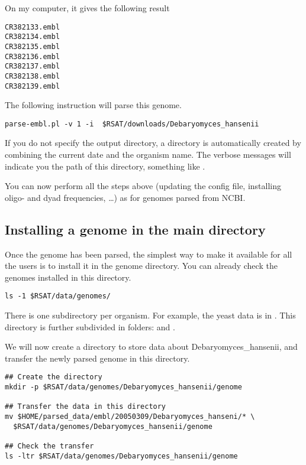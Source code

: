 On my computer, it gives the following result

\begin{footnotesize}
\begin{verbatim}
CR382133.embl
CR382134.embl
CR382135.embl
CR382136.embl
CR382137.embl
CR382138.embl
CR382139.embl
\end{verbatim}
\end{footnotesize}

The following instruction will parse this genome.

\begin{footnotesize}
\begin{verbatim}
parse-embl.pl -v 1 -i  $RSAT/downloads/Debaryomyces_hansenii
\end{verbatim}
\end{footnotesize}

If you do not specify the output directory, a directory is
automatically created by combining the current date and the organism
name.  The verbose messages will indicate you the path of this
directory, something like
.

You can now perform all the steps above (updating the config file,
installing oligo- and dyad frequencies, \ldots) as for genomes parsed
from NCBI.



\subsection{Installing a genome in the main \RSAT directory}

Once the genome has been parsed, the simplest way to make it available
 for all the users is to install it in the \RSAT genome directory. You
 can already check the genomes installed in this directory.

\begin{footnotesize}
\begin{verbatim}
ls -1 $RSAT/data/genomes/
\end{verbatim}
\end{footnotesize}

There is one subdirectory per organism. For example, the yeast data is
 in . This
 directory is further subdivided in folders:  and
 .

We will now create a directory to store data about
 Debaryomyces\_hansenii, and transfer the newly parsed genome in this
 directory.

\begin{footnotesize}
\begin{verbatim}
## Create the directory
mkdir -p $RSAT/data/genomes/Debaryomyces_hansenii/genome

## Transfer the data in this directory
mv $HOME/parsed_data/embl/20050309/Debaryomyces_hanseni/* \
  $RSAT/data/genomes/Debaryomyces_hansenii/genome

## Check the transfer
ls -ltr $RSAT/data/genomes/Debaryomyces_hansenii/genome
\end{verbatim}
\end{footnotesize}
